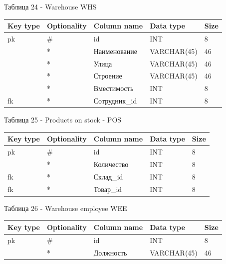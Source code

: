 \documentclass[14pt]{extreport}
\begin{document}
\noindent
Таблица 24 - Warehouse WHS
\begin{center}
\begin{longtable}{ |m{1.3cm}|m{2.7cm}|m{4.5cm}|m{3.5cm}|m{1.8cm}| } 
 \hline
 Key type & Optionality & Column name & Data type & Size \\ [0.5ex] 
 \hline\hline
 pk & \# & id & INT & 8 \\
 \hline
  & * & Наименование & VARCHAR(45) & 46 \\
 \hline
  & * & Улица & VARCHAR(45) & 46 \\
 \hline
  & * & Строение & VARCHAR(45) & 46 \\
 \hline
  & * & Вместимость & INT & 8 \\
 \hline
 fk & * & Сотрудник\_id & INT & 8 \\
 \hline
\end{longtable}
\end{center}


\noindent
Таблица 25 - Products on stock - POS
\begin{center}
\begin{longtable}{ |m{1.3cm}|m{2.7cm}|m{4.5cm}|m{3.5cm}|m{1.8cm}| } 
 \hline
 Key type & Optionality & Column name & Data type & Size \\ [0.5ex] 
 \hline\hline
 pk & \# & id & INT & 8 \\
 \hline
  & * & Количество & INT & 8 \\
 \hline
 fk & * & Склад\_id & INT & 8 \\
 \hline
 fk & * & Товар\_id & INT & 8 \\
 \hline
\end{longtable}
\end{center}


\noindent
Таблица 26 - Warehouse employee WEE
\begin{center}
\begin{longtable}{ |m{1.3cm}|m{2.7cm}|m{4.5cm}|m{3.5cm}|m{1.8cm}| } 
 \hline
 Key type & Optionality & Column name & Data type & Size \\ [0.5ex] 
 \hline\hline
 pk & \# & id & INT & 8 \\
 \hline
  & * & Должность & VARCHAR(45) & 46 \\
 \hline
\end{longtable}
\end{center}


\newpage
\end{document}
